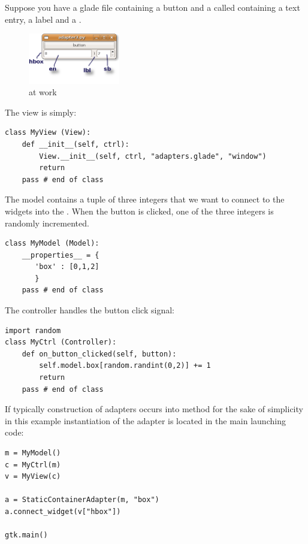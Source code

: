Suppose you have a glade file containing a button and a
 called  containing a text entry, a
label and a .

\begin{figure}[here]
\begin{center}
\includegraphics[width=4cm]{figs/png/adap2}
\caption{\label{ADAP2_f}  at work}
\end{center}
\end{figure}

The view is simply:

{ \codesize
  \begin{verbatim}
class MyView (View):
    def __init__(self, ctrl):
        View.__init__(self, ctrl, "adapters.glade", "window")
        return
    pass # end of class
  \end{verbatim}
}

The model contains a tuple of three integers that we want to connect
to the widgets into the . When the button is clicked,
one of the three integers is randomly incremented.

{ \codesize
  \begin{verbatim}
class MyModel (Model):
    __properties__ = {
       'box' : [0,1,2]
       }
    pass # end of class
  \end{verbatim}
}

The controller handles the button click signal:
{ \codesize
  \begin{verbatim}
import random
class MyCtrl (Controller):
    def on_button_clicked(self, button):
        self.model.box[random.randint(0,2)] += 1
        return
    pass # end of class
  \end{verbatim}
}

If typically construction of adapters occurs into method
 for the sake of simplicity in this
example instantiation of the adapter is located in the main
launching code:

{ \codesize
\begin{verbatim}
m = MyModel()
c = MyCtrl(m)
v = MyView(c)

a = StaticContainerAdapter(m, "box")
a.connect_widget(v["hbox"])

gtk.main()
\end{verbatim}
}

